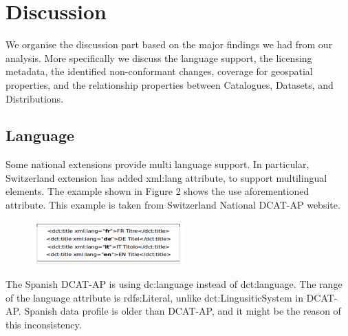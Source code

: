 \documentclass[<options>]{elsarticle}
\begin{document}
\section{Discussion}
We organise the discussion part based on the major findings we had from our analysis. More specifically we discuss the language support, the licensing metadata, the identified non-conformant changes, coverage for geospatial properties, and the relationship properties between Catalogues, Datasets, and Distributions.

\subsection{Language}
Some national extensions provide multi language support. In particular, Switzerland extension has added xml:lang attribute, to support multilingual elements. The example shown in Figure 2 shows the use aforementioned attribute. This example is taken from Switzerland National DCAT-AP website.

\begin{figure}[!h]
\includegraphics{replace26.png}
\end{figure}

The Spanish DCAT-AP is using dc:language instead of  dct:language. The range of the language attribute is rdfs:Literal, unlike dct:LingusiticSystem in DCAT-AP. Spanish data profile is older than DCAT-AP, and it might be the reason of this inconsistency.  
\end{document}
